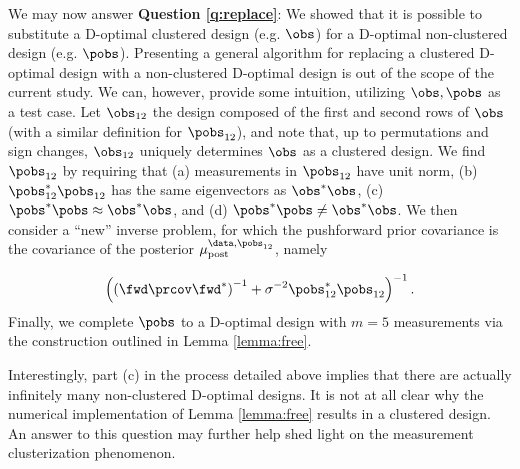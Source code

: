 We may now answer \textbf{Question \ref{q:replace}}: We showed that it
is possible to substitute a D-optimal clustered design (e.g. $\obs$)
for a D-optimal non-clustered design (e.g. $\pobs$). Presenting a
general algorithm for replacing a clustered D-optimal design with a
non-clustered D-optimal design is out of the scope of the current
study. We can, however, provide some intuition, utilizing $\obs,
\pobs$ as a test case. Let $\obs_{12}$ the design composed of the
first and second rows of $\obs$ (with a similar definition for
$\pobs_{12}$), and note that, up to permutations and sign changes,
$\obs_{12}$ uniquely determines $\obs$ as a clustered design. We find
$\pobs_{12}$ by requiring that (a) measurements in $\pobs_{12}$ have
unit norm, (b) $\pobs_{12}^* \pobs_{12}$ has the same eigenvectors as
$\obs^*\obs$, (c) $\pobs^*\pobs \approx \obs^*\obs$, and (d)
$\pobs^*\pobs \neq \obs^*\obs$. We then consider a ``new'' inverse
problem, for which the pushforward prior covariance is the covariance
of the posterior $\mu_{\textup{post}}^{\data, \pobs_{12}}$, namely

$$
\left(\left(\fwd \prcov\fwd^*\right)^{-1} + \sigma^{-2}
\pobs_{12}^*\pobs_{12}\right)^{-1}.
$$
%
Finally, we complete $\pobs$ to a D-optimal design with $m=5$
measurements via the construction outlined in Lemma
\ref{lemma:free}.

Interestingly, part (c) in the process detailed above implies that
there are actually infinitely many non-clustered D-optimal designs. It
is not at all clear why the numerical implementation of Lemma
\ref{lemma:free} results in a clustered design. An answer to this
question may further help shed light on the measurement clusterization
phenomenon.


\clusterization


\noclusterization


